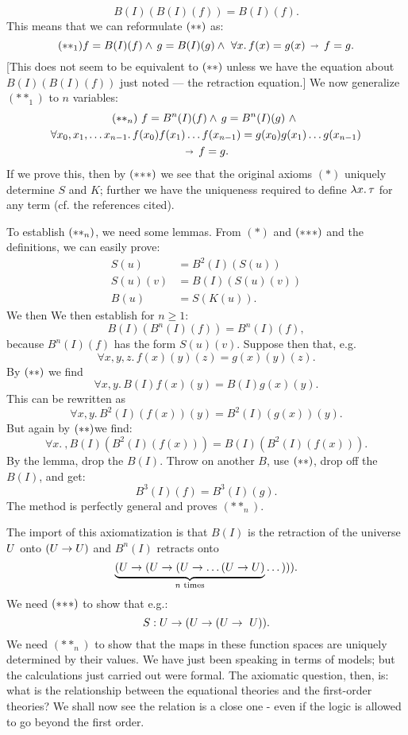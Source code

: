 $$
B(I)(B(I)(f)) = B(I)(f).
$$
This means that we can reformulate $\ss$ as:
$$
(**_1) f = B(I)(f) \land\, g = B(I)(g) \land\,\, \forall x.\,f(x) = g(x) \, \imp\, f = g.
$$
[This does not seem to be equivalent to $\ss$ unless we have the
equation about $B(I)(B(I)(f))$ just noted --- the retraction equation.] We now generalize $(**_1)$ to $n$ variables:
\begin{multline*}
\ssn \,\,
f = B^n(I)(f) \land\, g = B^n(I)(g) \,\,\land\,\, \\
\forall x_0, x_1, \dots x_{n-1}.\,f(x_0)f(x_1)\dots f(x_{n-1}) = g(x_0)g(x_1)\dots g(x_{n-1})\\
 \, \imp\, f = g.
\end{multline*}
If we prove this, then by $\sss$ we see that the original axioms $(*)$ uniquely determine $S$ and $K$; further we have the uniqueness required to define $\lm{x}.\tau$ for any term (cf. the references cited).

To establish $\ssn$, we need some lemmas.  From $(*)$ and $\sss$ and the definitions, we can easily prove:
\begin{align*}
S(u) &= B^2(I)(S(u))\\
S(u)(v) &= B(I)(S(u)(v))\\
B(u) &= S(K(u)).
\end{align*}
%
We then We then establish for $n\geq 1$:
$$
B(I)(B^n(I)(f)) = B^n(I)(f),
$$
because $B^n(I)(f)$ has the form $S(u)(v)$. Suppose then that, e.g.
$$
\forall x, y, z .\, f(x)(y)(z) = g(x)(y)(z).
$$
By $\ss$ we find
$$
\forall x, y. \, B(I)f(x)(y) = B(I)g(x)(y).
$$
This can be rewritten as
$$
\forall x,y. \, B^2(I)(f(x))(y) = B^2(I)(g(x))(y).
$$
But again by $\ss$we find:
$$
\forall x.\ , B(I)(B^2(I)(f(x)))=B(I)(B^2(I)(f(x))).
$$
By the lemma, drop the $B(I)$. Throw on another $B$, use $\ss$, drop off the $B(I)$, and get:
$$
B^3(I)(f) = B^3(I)(g).
$$
The method is perfectly general and proves $(**_n)$.

The import of this axiomatization is that $B(I)$ is the retraction of the universe $\U$ onto $(\U \to \U)$ and $B^n (I)$ retracts onto
$$
\underbrace{(\U \to (\U \to (\U \to \dots (\U \to \U)}_{n {\textrm{ times}}} \dots ))).
$$
We need $\sss$ to show that e.g.:
$$
S: \U \to (\U \to (\U \to\ U)).
$$
We need $(**_n)$ to show that the maps in these function spaces are uniquely determined by their values.
We have just been speaking in terms of models; but the calculations just carried out were formal. The axiomatic question, then, is: what is the relationship between the equational theories and the first-order theories? We shall now see the relation is a close one - even if the logic is allowed to go beyond the first order.


